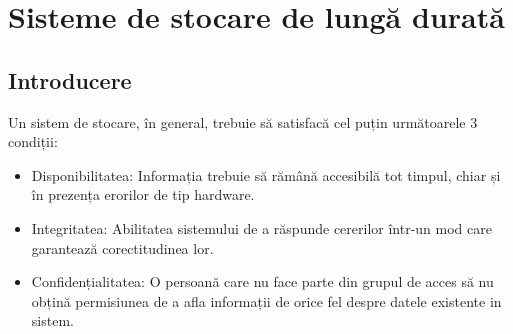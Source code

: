 \documentclass[oneside, 12pt]{book}
\begin{document}



\chapter{Sisteme de stocare de lungă durată}


\section{Introducere}
\label{sec:long_term_systems_intro}

Un sistem de stocare, în general, trebuie să satisfacă cel puțin următoarele 3 condiții:
\begin{itemize}
	\item Disponibilitatea: Informația trebuie să rămână accesibilă tot timpul, chiar și în prezența erorilor de tip hardware.
	\item Integritatea: Abilitatea sistemului de a răspunde cererilor într-un mod care garantează corectitudinea lor.
	\item Confidențialitatea: O persoană care nu face parte din grupul de acces să nu obțină permisiunea de a afla informații de orice fel despre datele existente in sistem.
\end{itemize}
\end{document}
